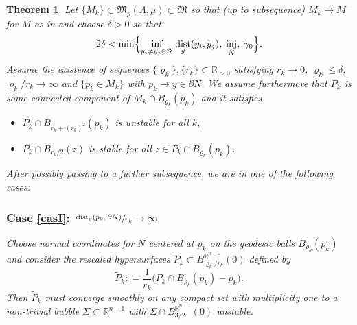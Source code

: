 \documentclass[10pt]{amsart}
\let\mathcal\mathscr
\newcounter{cas}
\DeclareMathOperator{\dist}{dist}
\DeclareMathOperator{\inj}{inj}
\newtheorem{thm}{Theorem}
\theoremstyle{definition}
\newcommand{\R}{\mathbb{R}}
\begin{document}
\begin{thm}\label{thm:blowup}
Let $\{M_k\}\subset \mathfrak{M}_p(\Lambda, \mu) \subset \mathfrak{M}$ so that (up to subsequence) $M_k\to M$ for $M$ as in \cite[Th.\,29]{ACS17} and choose $\delta>0$ so that
\begin{equation*}
2\delta<\min\Bigl\{\inf_{ y_i\neq y_j\in \mathcal{Y}} \dist_g(y_i,y_j),\; \inj_N,\; \gamma_0 \Bigr\}.
\end{equation*} Assume the existence of sequences $\{\varrho_k\},\{r_k\}\subset \R_{>0}$ satisfying $r_k\to 0$, $\varrho_k\leq \delta$, $\varrho_k/r_k\to \infty$ and $\{p_k\in M_k\}$ with $p_k\to y\in \partial N$. We assume furthermore that $P_k$ is some connected component of $M_k\cap B_{\varrho_k}(p_k)$ and it satisfies
\begin{itemize}
\item $P_k\cap B_{r_k + (r_k)^2}(p_k)$ is unstable for all $k$,
\item $P_k\cap B_{r_k/2}(z)$ is stable for all $z\in P_k\cap B_{\varrho_k}(p_k)$.
\end{itemize}

After possibly passing to a further subsequence, we are in one of the following cases: 

\vspace*{-.3\baselineskip}
\subsubsection*{\label{casI}Case \ref{casI}: $\sfrac{\dist_g(p_k,\partial N)}{r_k}\to\infty$} Choose normal coordinates for $N$ centered at $p_k$ on the geodesic balls $B_{\varrho_k}(p_k)$ and consider the rescaled hypersurfaces $\widetilde{P}_k \subset B^{\R^{n+1}}_{\varrho_k/r_k}(0)$ defined by
\begin{equation*}
\widetilde{P}_k : = \frac{1}{r_k} \big(P_k\cap B_{\varrho_k}(p_k)- p_k\big).
\end{equation*} Then $\widetilde{P}_k$ must converge smoothly on any compact set with multiplicity one to a non-trivial bubble $\Sigma\subset \R^{n+1}$ with $\Sigma\cap B^{\R^{n+1}}_{3/2}(0)$ unstable. 

\vspace*{-.3\baselineskip}

\end{thm}
\end{document}
